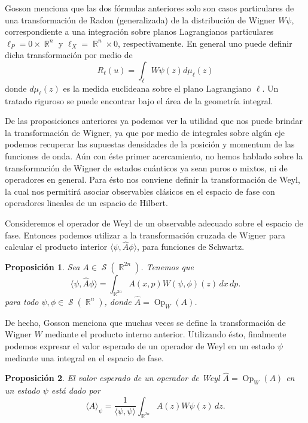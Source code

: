 \documentclass[a4paper]{report}
\DeclareMathOperator{\R}{\mathbb{R}}
\DeclareMathOperator{\Sz}{\mathcal S}
\DeclareMathOperator{\Op}{Op}
\newtheorem{proposition}{Proposición}
\begin{document}
  Gosson menciona que las dos fórmulas anteriores solo son
  casos particulares de una transformación de Radon
  (generalizada) de la distribución de Wigner $W\psi$,
  correspondiente a una integración sobre planos
  Lagrangianos particulares $\ell_P = 0 \times \R^{n}$ y
  $\ell_X = \R^{n} \times 0$, respectivamente. En general
  uno puede definir dicha transformación por medio de
  \[
    R_{\ell}(u)
    = \int_{\ell} W\psi(z) d\mu_{\ell}(z)
  \] 
  donde $d\mu_{\ell}(z)$ es la medida euclideana sobre el
  plano Lagrangiano $\ell$. Un tratado riguroso se puede
  encontrar bajo el área de la geometría integral.

  De las proposiciones anteriores ya podemos ver la utilidad
  que nos puede brindar la transformación de Wigner, ya que
  por medio de integrales sobre algún eje podemos recuperar
  las supuestas densidades de la posición y momentum de las
  funciones de onda. Aún con éste primer acercamiento, no
  hemos hablado sobre la transformación de Wigner de estados
  cuánticos ya sean puros o mixtos, ni de operadores en
  general. Para ésto nos conviene definir la transformación
  de Weyl, la cual nos permitirá asociar observables
  clásicos en el espacio de fase con operadores lineales de
  un espacio de Hilbert.

  Consideremos el operador de Weyl de un observable adecuado
  sobre el espacio de fase. Entonces podemos utilizar a la
  transformación cruzada de Wigner para calcular el producto
  interior $\langle \psi, \hat{A}\phi \rangle$, para
  funciones de Schwartz.
  \begin{proposition}
    \label{prop:wigner-weyl}
    Sea $A \in \Sz(\R^{2n})$. Tenemos que
    \begin{equation}
      \langle \psi, \hat{A}\phi \rangle
      = \int_{\R^{2n}} A(x,p)W(\psi,\phi)(z) \, dx \, dp.
    \end{equation}
    para todo $\psi, \phi \in \Sz(\R^{n})$, donde $\hat{A} =
    \Op_W(A)$.
  \end{proposition}
  De hecho, Gosson menciona que muchas veces se define la
  transformación de Wigner $W$ mediante el producto interno
  anterior. Utilizando ésto, finalmente podemos expresar el
  valor esperado de un operador de Weyl en un estado $\psi$
  mediante una integral en el espacio de fase.
  \begin{proposition}
    El valor esperado de un operador de Weyl $\hat{A} =
    \Op_W(A)$ en un estado $\psi$ está dado por
    \begin{equation}
      \langle \hat{A} \rangle_\psi
      = \frac{1}{\langle \psi, \psi \rangle} 
      \int_{\R^{2n}} A(z) W\psi(z) \, dz.
    \end{equation}
  \end{proposition}  
\end{document}

